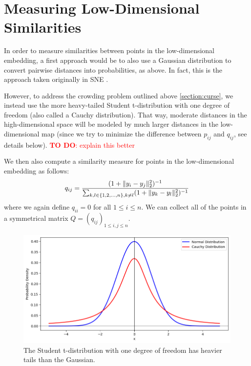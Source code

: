 \section{Measuring Low-Dimensional Similarities}
In order to measure similarities between points in the low-dimensional embedding, a first approach would be to also use a Gaussian distribution to convert pairwise distances into probabilities, as above. 
In fact, this is the approach taken originally in SNE \cite{Hinton02}.

However, to address the crowding problem outlined above \ref{section:curse}, we instead use the more heavy-tailed Student t-distribution with one degree of freedom (also called a Cauchy distribution). 
That way, moderate distances in the high-dimensional space will be modeled by much larger distances in the low-dimensional map (since we try to minimize the difference between $p_{ij}$ and $q_{ij}$, see details below). 
\textcolor{red}{\textbf{TO DO}: explain this better}


We then also compute a similarity measure for points in the low-dimensional embedding as follows: 
\begin{equation}
    q_{ij} = \frac{(1+ \lVert y_i - y_j\rVert_2^2)^{-1}}{\sum_{k, l \in \{1,2, \dots, n\}, k \neq l} (1+\lVert y_k - y_l\rVert_2^2)^{-1}}
\end{equation}
where we again define $q_{ii} = 0$ for all $1 \leq i \leq n$. We can collect all of the points in a symmetrical matrix $Q = (q_{ij})_{1 \leq i, j \leq n}$. 


\begin{figure}[h]
    \begin{center}
        \includegraphics[width=0.9\linewidth]{figures/Gaussian_Cauchy.png}
        \caption{The Student t-distribution with one degree of freedom has heavier tails than the Gaussian.}
    \end{center}
\end{figure}

